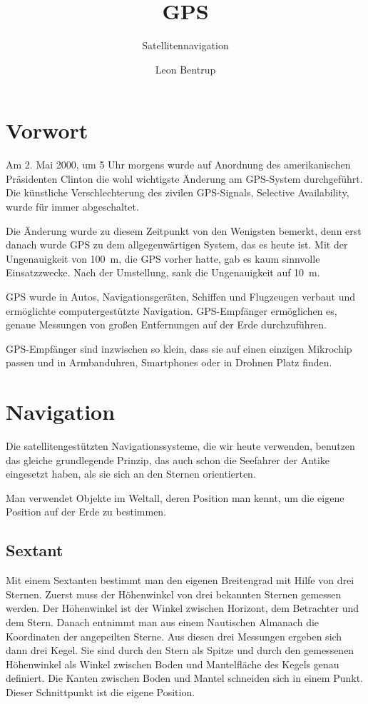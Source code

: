 \documentclass[12pt,a4paper]{scrartcl}
\author{Leon Bentrup}
\title{GPS}
\subtitle{Satellitennavigation}
\begin{document}
\maketitle
\newpage
\tableofcontents
\newpage
{}

\section{Vorwort}
Am 2. Mai 2000, um 5 Uhr morgens wurde auf Anordnung des amerikanischen Präsidenten Clinton die wohl wichtigste Änderung am GPS-System durchgeführt. Die künstliche Verschlechterung des zivilen GPS-Signals, Selective Availability, wurde für immer abgeschaltet.

Die Änderung wurde zu diesem Zeitpunkt von den Wenigsten bemerkt, denn erst danach wurde GPS zu dem allgegenwärtigen System, das es heute ist. Mit der Ungenauigkeit von \SI{100}{\meter}, die GPS vorher hatte, gab es kaum sinnvolle Einsatzzwecke. Nach der Umstellung, sank die Ungenauigkeit auf \SI{10}{\meter}.

GPS wurde in Autos, Navigationsgeräten, Schiffen und Flugzeugen verbaut und ermöglichte computergestützte Navigation. GPS-Empfänger ermöglichen es, genaue Messungen von großen Entfernungen auf der Erde durchzuführen.

GPS-Empfänger sind inzwischen so klein, dass sie auf einen einzigen Mikrochip passen und in Armbanduhren, Smartphones oder in Drohnen Platz finden.
\section{Navigation}
Die satellitengestützten Navigationssysteme, die wir heute verwenden, benutzen das gleiche grundlegende Prinzip, das auch schon die Seefahrer der Antike eingesetzt haben, als sie sich an den Sternen orientierten.

Man verwendet Objekte im Weltall, deren Position man kennt, um die eigene Position auf der Erde zu bestimmen.

\subsection{Sextant}
Mit einem Sextanten bestimmt man den eigenen Breitengrad mit Hilfe von drei Sternen.
Zuerst muss der Höhenwinkel von drei bekannten Sternen gemessen werden. Der Höhenwinkel ist der Winkel zwischen Horizont, dem Betrachter und dem Stern.
Danach entnimmt man aus einem Nautischen Almanach die Koordinaten der angepeilten Sterne. Aus diesen drei Messungen ergeben sich dann drei Kegel. Sie sind durch den Stern als Spitze und durch den gemessenen Höhenwinkel als Winkel zwischen Boden und Mantelfläche des Kegels genau definiert. Die Kanten zwischen Boden und Mantel schneiden sich in einem Punkt. Dieser Schnittpunkt ist die eigene Position.
\end{document}
